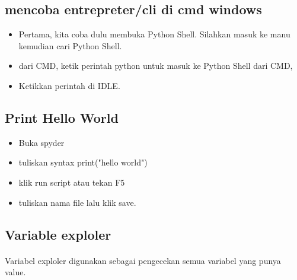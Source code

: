 \documentclass{article}
\begin{document}
\subsection{ mencoba entrepreter/cli di cmd windows}
\begin{itemize}
     \item Pertama, kita coba dulu membuka Python Shell. Silahkan masuk ke manu kemudian cari Python Shell.
    \item dari CMD, ketik perintah python untuk masuk ke Python Shell dari CMD,
    \item Ketikkan perintah di IDLE.
\end{itemize}
\subsection{Print Hello World}
\begin{itemize}
	\item Buka spyder
	\item tuliskan syntax print("hello world")
	\item klik run script atau tekan F5
	\item tuliskan nama file lalu klik save.
\end{itemize}
\subsection{Variable exploler}
\paragraph{}
Variabel exploler digunakan sebagai pengecekan semua variabel yang punya value.
\end{document}
